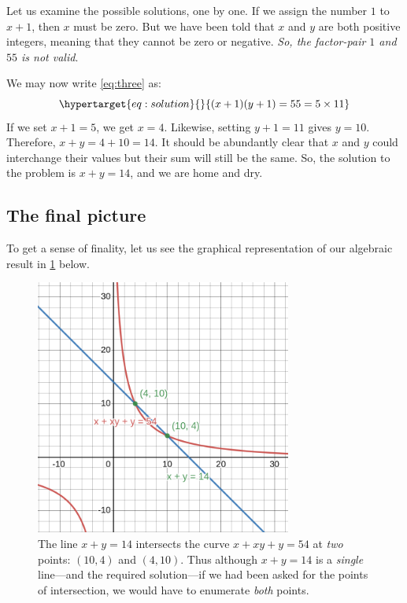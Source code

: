 \documentclass[
  a4paper,
]{article}
\begin{document}
Let us examine the possible solutions, one by one. If we assign the
number \(1\) to \(x + 1\), then \(x\) must be zero. But we have been
told that \(x\) and \(y\) are both positive integers, meaning that they
cannot be zero or negative. \emph{So, the factor-pair \(1\) and \(55\)
is not valid}.

We may now write \cref{eq:three} as:
\begin{equation}\protect\hypertarget{eq:solution}{}{
(x+1)(y+1) = 55 = 5\times 11
}\label{eq:solution}\end{equation} If we set \(x + 1 = 5\), we get
\(x = 4\). Likewise, setting \(y + 1 = 11\) gives \(y = 10\). Therefore,
\(x + y = 4 + 10 = 14\). It should be abundantly clear that \(x\) and
\(y\) could interchange their values but their sum will still be the
same. So, the solution to the problem is \(x + y = 14\), and we are home
and dry.

\hypertarget{the-final-picture}{%
\subsection{The final picture}\label{the-final-picture}}

To get a sense of finality, let us see the graphical representation of
our algebraic result in \cref{fig:four} below.

\begin{figure}
\hypertarget{fig:four}{%
\centering
\includegraphics[width=0.75\textwidth,height=\textheight]{images/olympiad-four.png}
\caption{The line \(x + y = 14\) intersects the curve \(x + xy +y = 54\)
at \emph{two} points: \((10, 4)\) and \((4, 10)\). Thus although
\(x + y = 14\) is a \emph{single} line---and the required solution---if
we had been asked for the points of intersection, we would have to
enumerate \emph{both} points.}\label{fig:four}
}
\end{figure}
\end{document}
